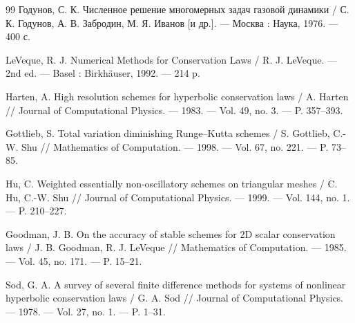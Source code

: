 \documentclass[a4paper,14pt]{extarticle}
\theoremstyle{theorem}
\theoremstyle{lemma}
\begin{document}
\begin{thebibliography}{99}
Годунов, С. К. Численное решение многомерных задач газовой динамики / С. К. Годунов, А. В. Забродин, М. Я. Иванов [и др.]. --- Москва : Наука, 1976. --- 400 с.

LeVeque, R. J. Numerical Methods for Conservation Laws / R. J. LeVeque. --- 2nd ed. --- Basel : Birkh\"auser, 1992. --- 214 p.


Harten, A. High resolution schemes for hyperbolic conservation laws / A. Harten // Journal of Computational Physics. --- 1983. --- Vol. 49, no. 3. --- P. 357--393.

Gottlieb, S. Total variation diminishing Runge--Kutta schemes / S. Gottlieb, C.-W. Shu // Mathematics of Computation. --- 1998. --- Vol. 67, no. 221. --- P. 73--85.

Hu, C. Weighted essentially non-oscillatory schemes on triangular meshes / C. Hu, C.-W. Shu // Journal of Computational Physics. --- 1999. --- Vol. 144, no. 1. --- P. 210--227.

Goodman, J. B. On the accuracy of stable schemes for 2D scalar conservation laws / J. B. Goodman, R. J. LeVeque // Mathematics of Computation. --- 1985. --- Vol. 45, no. 171. --- P. 15--21.

Sod, G. A. A survey of several finite difference methods for systems of nonlinear hyperbolic conservation laws / G. A. Sod // Journal of Computational Physics. --- 1978. --- Vol. 27, no. 1. --- P. 1--31.



\end{thebibliography}
\end{document}
